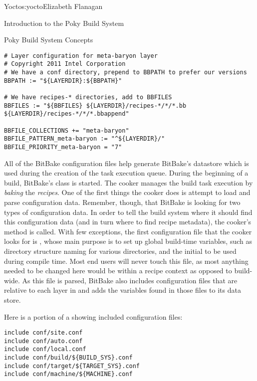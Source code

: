 \begin{aosachapter}{Yocto}{s:yocto}{Elizabeth Flanagan}
\begin{aosasect1}{Introduction to the Poky Build System}
\begin{aosasect2}{Poky Build System Concepts}
\begin{verbatim}
# Layer configuration for meta-baryon layer
# Copyright 2011 Intel Corporation
# We have a conf directory, prepend to BBPATH to prefer our versions
BBPATH := "${LAYERDIR}:${BBPATH}"

# We have recipes-* directories, add to BBFILES
BBFILES := "${BBFILES} ${LAYERDIR}/recipes-*/*/*.bb ${LAYERDIR}/recipes-*/*/*.bbappend"

BBFILE_COLLECTIONS += "meta-baryon"
BBFILE_PATTERN_meta-baryon := "^${LAYERDIR}/"
BBFILE_PRIORITY_meta-baryon = "7"
\end{verbatim}

All of the BitBake configuration files help generate BitBake's
datastore which is used during the creation of the task execution
queue. During the beginning of a build, BitBake's  class is
started. The cooker manages the build task execution by \emph{baking} the
\emph{recipes}. One of the first things the cooker does is attempt to load
and parse configuration data. Remember, though, that BitBake is
looking for two types of configuration data. In order to tell the
build system where it should find this configuration data (and in turn
where to find recipe metadata), the cooker's 
method is called.  With few exceptions, the first configuration file
that the cooker looks for is , whose main purpose is to
set up global build-time variables, such as directory structure naming
for various  directories, and the initial  to be used during
compile time. Most end users will never touch this file, as most
anything needed to be changed here would be within a recipe context as
opposed to build-wide. As this file is parsed, BitBake also includes
configuration files that are relative to each layer in  and
adds the variables found in those files to its data store.

Here is a portion of a  showing included configuration files:

\begin{verbatim}
include conf/site.conf
include conf/auto.conf
include conf/local.conf
include conf/build/${BUILD_SYS}.conf
include conf/target/${TARGET_SYS}.conf
include conf/machine/${MACHINE}.conf
\end{verbatim}

\end{aosasect2}


\end{aosasect1}
\end{aosachapter}
